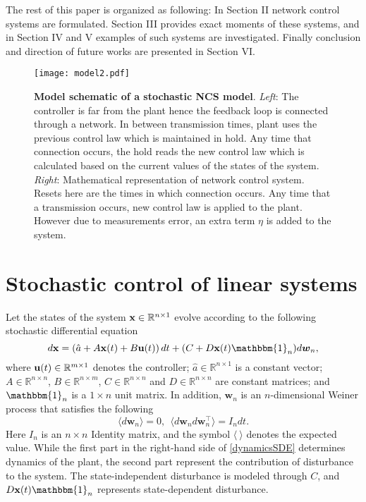 \documentclass[letterpaper, 10 pt,one column, conference]{ieeeconf}  %
\begin{document}
The rest of this paper is organized as following: In Section II network control systems are formulated. Section III provides exact moments of these systems, and in Section IV and V examples of such systems are investigated. Finally conclusion and direction of future works are presented in Section VI.




\begin{figure*}[!th]
	\centering
	{\texttt{[image: model2.pdf]}}
	\caption{{\bf Model schematic of a stochastic NCS model}. \textit{Left}: The controller is far from the plant hence the feedback loop is connected through a network. In between transmission times, plant uses the previous control law which is maintained in hold. Any time that connection occurs, the hold reads the new control law which is calculated based on the current values of the states of the system. \textit{Right}: Mathematical representation of network control system. Resets here are the times in which connection occurs. Any time that a transmission occurs, new control law is applied to the plant. However due to measurements error, an extra term $\eta$ is added to the system.}
\end{figure*}






\section{Stochastic control of linear systems}
Let the states of the system $\bold x \in \mathbb{R}^{n \times 1}$ evolve according to the 
following stochastic differential equation
\begin{equation}
d\bold x= \left(\hat{a}+A \bold x(t)+B \bold u(t)\right)dt + (C+D\bold{x}(t)\mathbbm{1}_n)d \boldsymbol w_n ,
		\label{dynamicsSDE}	
		\end{equation}
where $\bold u (t)\in \mathbb{R}^{m \times 1}$ denotes the controller; $\hat{a}\in \mathbb{R}^{n\times 1}$ is a constant vector; $A\in \mathbb{R}^{n\times n}$, $B \in \mathbb{R}^{ n \times m}$, $C\in \mathbb{R}^{n\times n}$ and $D \in \mathbb{R}^{ n \times n}$ are constant matrices;  and $\mathbbm{1}_n$ is a $1 \times n$ unit matrix. In addition, $\boldsymbol w_n$ is an $n$-dimensional Weiner process that satisfies the following
\begin{equation}
\langle d \boldsymbol w_n \rangle = 0, \ \   \langle d \boldsymbol w_n  d \boldsymbol w_n ^\top \rangle = I_n dt.
\end{equation}
Here $I_n$ is an $n \times  n$ Identity matrix, and the symbol $\langle \ \rangle$ denotes the expected value. While the first part in the right-hand side of \eqref{dynamicsSDE} determines dynamics of the plant, the second part represent the contribution of disturbance to the system. The state-independent disturbance is modeled through $C$, and $D\bold{x}(t)\mathbbm{1}_n$ represents state-dependent disturbance. 	 
\end{document}

